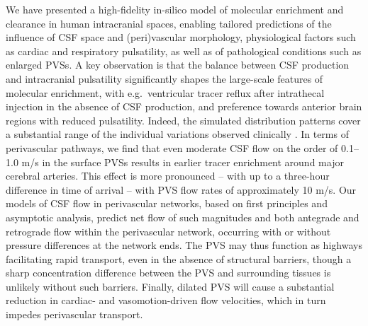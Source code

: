 \documentclass[fleqn,10pt]{wlscirep}
\begin{document}
We have presented a high-fidelity in-silico model of molecular
enrichment and clearance in human intracranial spaces, enabling
tailored predictions of the influence of CSF space and (peri)vascular
morphology, physiological factors such as cardiac and respiratory
pulsatility, as well as of pathological conditions such as enlarged
PVSs. A key observation is that the balance between CSF production and
intracranial pulsatility significantly shapes the large-scale features
of molecular enrichment, with e.g.~ventricular tracer reflux after
intrathecal injection in the absence of CSF production, and preference
towards anterior brain regions with reduced pulsatility. Indeed, the
simulated distribution patterns cover a substantial range of the
individual variations observed clinically \cite{ringstad2018brain}. In
terms of perivascular pathways, we find that even moderate CSF flow on
the order of 0.1--1.0 \textmu m/s in the surface PVSs results in
earlier tracer enrichment around major cerebral arteries. This effect
is more pronounced -- with up to a three-hour difference in time of
arrival -- with PVS flow rates of approximately 10 \textmu m/s. Our
models of CSF flow in perivascular networks, based on first principles
and asymptotic analysis, predict net flow of such magnitudes and both
antegrade and retrograde flow within the perivascular network,
occurring with or without pressure differences at the network
ends. The PVS may thus function as highways facilitating rapid
transport, even in the absence of structural barriers, though a sharp
concentration difference between the PVS and surrounding tissues is
unlikely without such barriers. Finally, dilated PVS will cause a
substantial reduction in cardiac- and vasomotion-driven flow
velocities, which in turn impedes perivascular transport.

\end{document}
